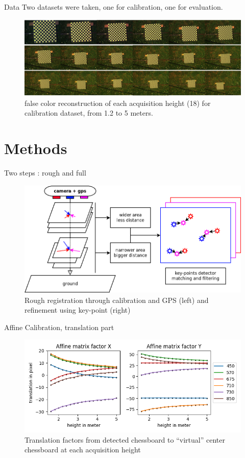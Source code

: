 \documentclass{beamer}
\begin{document}
		\begin{frame}{Data}
			Two datasets were taken, one for calibration, one for evaluation.
			\begin{figure}
				\includegraphics[width=\linewidth]{../figures/calibration-height.jpg}
				\caption{false color reconstruction of each acquisition height (18) for calibration dataset, from 1.2 to 5 meters.}
			\end{figure}
		\end{frame}
	
	\section{Methods}
	
		\begin{frame}{Two steps : rough and full}
			\begin{figure}
				\centering
				\includegraphics[width=\linewidth]{Diagram1}
				\caption{Rough registration through calibration and GPS (left) and refinement using key-point (right)}
				\label{fig:diagram1}
			\end{figure}
		\end{frame}
	
	
		\begin{frame}{Affine Calibration, translation part}
			\begin{figure}
				\includegraphics[width=0.7\linewidth]{../figures/affine-translation-height.png}
				\caption{Translation factors from detected chessboard to ``virtual'' center chessboard at each acquisition height}
			\end{figure}
		\end{frame}
\end{document}
